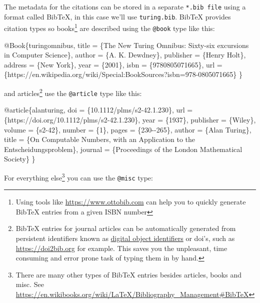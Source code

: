 \documentclass[
]{book}
\newenvironment{Shaded}{\begin{snugshade}}{\end{snugshade}}
\newcommand{\NormalTok}[1]{#1}
\begin{document}
The metadata for the citations can be stored in a separate \texttt{*.bib\ file} using a format called BibTeX, in this case we'll use \texttt{turing.bib}. BibTeX provides citation types so books\footnote{Using tools like \url{https://www.ottobib.com} can help you to quickly generate BibTeX entries from a given ISBN number} are described using the \texttt{@book} type like this:

\begin{Shaded}
\begin{Highlighting}[]
\NormalTok{@Book\{turingomnibus,}
\NormalTok{  title = \{The New Turing Omnibus: Sixty{-}six excursions in Computer Science\},}
\NormalTok{  author = \{A. K. Dewdney\},}
\NormalTok{  publisher = \{Henry Holt\},}
\NormalTok{  address = \{New York\},}
\NormalTok{  year = \{2001\},}
\NormalTok{  isbn = \{9780805071665\},}
\NormalTok{  url = \{https://en.wikipedia.org/wiki/Special:BookSources?isbn=978{-}0805071665\}}
\NormalTok{\}}
\end{Highlighting}
\end{Shaded}

and articles\footnote{BibTeX entries for journal articles can be automatically generated from persistent identifiers known as \href{https://en.wikipedia.org/wiki/Digital_object_identifier}{digital object identifiers} or doi's, such as \url{https://doi2bib.org} for example. This saves you the unpleasant, time consuming and error prone task of typing them in by hand.} use the \texttt{@article} type like this:

\begin{Shaded}
\begin{Highlighting}[]
\NormalTok{@article\{alanturing,}
\NormalTok{  doi = \{10.1112/plms/s2{-}42.1.230\},}
\NormalTok{  url = \{https://doi.org/10.1112/plms/s2{-}42.1.230\},}
\NormalTok{  year = \{1937\},}
\NormalTok{  publisher = \{Wiley\},}
\NormalTok{  volume = \{s2{-}42\},}
\NormalTok{  number = \{1\},}
\NormalTok{  pages = \{230{-}{-}265\},}
\NormalTok{  author = \{Alan Turing\},}
\NormalTok{  title = \{On Computable Numbers, with an Application to the Entscheidungsproblem\},}
\NormalTok{  journal = \{Proceedings of the London Mathematical Society\}}
\NormalTok{\}}
\end{Highlighting}
\end{Shaded}

For everything else\footnote{There are many other types of BibTeX entries besides articles, books and misc. See \url{https://en.wikibooks.org/wiki/LaTeX/Bibliography_Management\#BibTeX}} you can use the \texttt{@misc} type:
\end{document}
